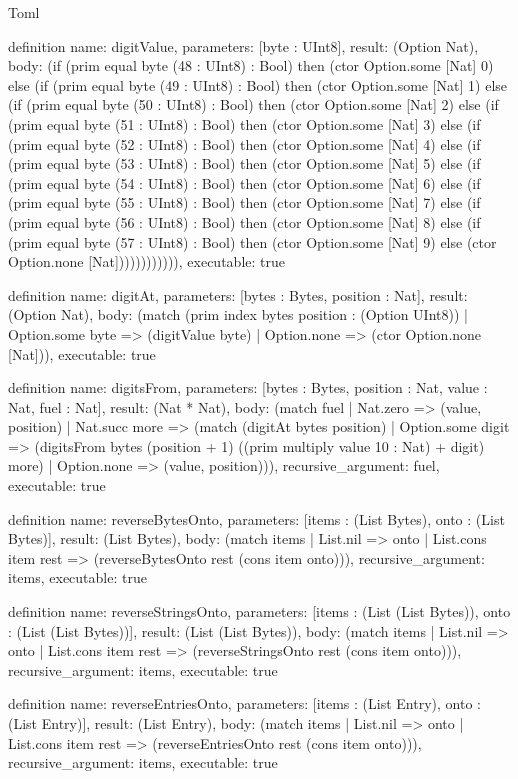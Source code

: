 \begin{lexlean}{Toml}
\begin{semanticmodule}
definition{
  name: digitValue,
  parameters: [byte : UInt8],
  result: (Option Nat),
  body: (if (prim equal byte (48 : UInt8) : Bool) then (ctor Option.some [Nat] 0) else (if (prim equal byte (49 : UInt8) : Bool) then (ctor Option.some [Nat] 1) else (if (prim equal byte (50 : UInt8) : Bool) then (ctor Option.some [Nat] 2) else (if (prim equal byte (51 : UInt8) : Bool) then (ctor Option.some [Nat] 3) else (if (prim equal byte (52 : UInt8) : Bool) then (ctor Option.some [Nat] 4) else (if (prim equal byte (53 : UInt8) : Bool) then (ctor Option.some [Nat] 5) else (if (prim equal byte (54 : UInt8) : Bool) then (ctor Option.some [Nat] 6) else (if (prim equal byte (55 : UInt8) : Bool) then (ctor Option.some [Nat] 7) else (if (prim equal byte (56 : UInt8) : Bool) then (ctor Option.some [Nat] 8) else (if (prim equal byte (57 : UInt8) : Bool) then (ctor Option.some [Nat] 9) else (ctor Option.none [Nat]))))))))))),
  executable: true
}

definition{
  name: digitAt,
  parameters: [bytes : Bytes, position : Nat],
  result: (Option Nat),
  body: (match (prim index bytes position : (Option UInt8))
    | Option.some byte => (digitValue byte)
    | Option.none => (ctor Option.none [Nat])),
  executable: true
}

definition{
  name: digitsFrom,
  parameters: [bytes : Bytes, position : Nat, value : Nat, fuel : Nat],
  result: (Nat * Nat),
  body: (match fuel
    | Nat.zero => (value, position)
    | Nat.succ more => (match (digitAt bytes position)
      | Option.some digit => (digitsFrom bytes (position + 1) ((prim multiply value 10 : Nat) + digit) more)
      | Option.none => (value, position))),
  recursive_argument: fuel,
  executable: true
}

definition{
  name: reverseBytesOnto,
  parameters: [items : (List Bytes), onto : (List Bytes)],
  result: (List Bytes),
  body: (match items
    | List.nil => onto
    | List.cons item rest => (reverseBytesOnto rest (cons item onto))),
  recursive_argument: items,
  executable: true
}

definition{
  name: reverseStringsOnto,
  parameters: [items : (List (List Bytes)), onto : (List (List Bytes))],
  result: (List (List Bytes)),
  body: (match items
    | List.nil => onto
    | List.cons item rest => (reverseStringsOnto rest (cons item onto))),
  recursive_argument: items,
  executable: true
}

definition{
  name: reverseEntriesOnto,
  parameters: [items : (List Entry), onto : (List Entry)],
  result: (List Entry),
  body: (match items
    | List.nil => onto
    | List.cons item rest => (reverseEntriesOnto rest (cons item onto))),
  recursive_argument: items,
  executable: true
}


\end{semanticmodule}
\end{lexlean}
